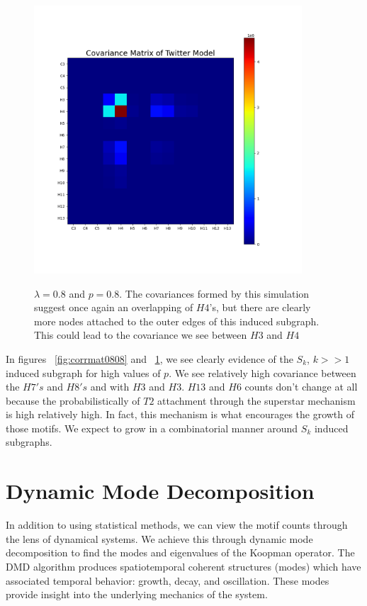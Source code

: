 \begin{figure}
    \includegraphics[width=10cm]{Images/CovMatTwitterModel080809.png}\
    \centering
    \caption{$\lambda=0.8$ and $p=0.8$. The covariances formed by this simulation suggest once again
    an overlapping of $H4$'s, but there are clearly more nodes attached to the outer edges of this
    induced subgraph. This could lead to the covariance we see between $H3$ and $H4$}
    \label{fig:covmat0808}
\end{figure}

\FloatBarrier

In figures ~\ref{fig:corrmat0808} and ~\ref{fig:covmat0808}, we see clearly evidence of the $S_k$, $k>>1$ induced subgraph
for high values of $p$. We see relatively high covariance between the $H7's$ and
$H8's$ and with $H3$ and $H3$. $H13$ and $H6$ counts don't change at all because the probabilistically
of $T2$ attachment through the superstar mechanism is high relatively high. In fact, this 
mechanism is what encourages the growth of those motifs. We expect to grow in a combinatorial manner
 around $S_k$ induced subgraphs.

\chapter{Dynamic Mode Decomposition}
In addition to using statistical methods, we can view the motif counts through the lens of dynamical systems. We achieve this through
dynamic mode decomposition to find the modes and eigenvalues of the Koopman operator.
 The DMD algorithm produces spatiotemporal coherent structures (modes)
which have associated temporal behavior: growth, decay, and oscillation. These modes provide insight into the underlying mechanics of 
the system.

